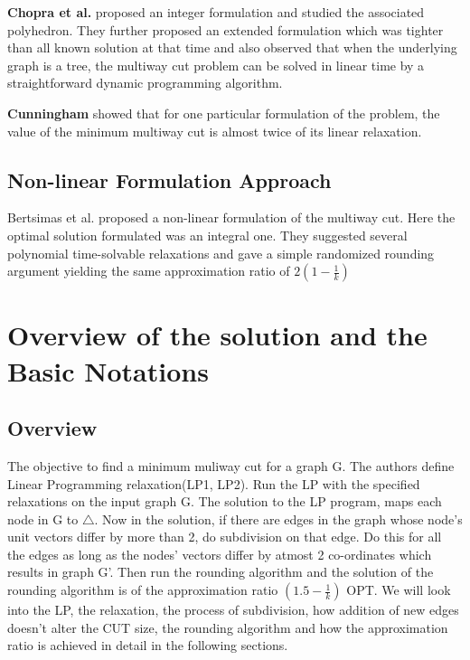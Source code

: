 \documentclass[11pt]{article}
\begin{document}
\textbf{Chopra et al.} proposed an integer formulation and studied the associated polyhedron. They further proposed an extended formulation  which was tighter than all known solution at that time and also observed that when the underlying graph is a tree, the multiway cut problem can be solved in linear time by a straightforward dynamic programming algorithm.

\textbf{Cunningham} showed that for one particular formulation of the problem, the value of the minimum multiway cut is almost twice of its linear relaxation.

\subsection{Non-linear Formulation Approach}
Bertsimas et al.\cite{Bertsimas} proposed a non-linear formulation of the multiway cut. Here the optimal solution formulated was an integral one. They suggested several polynomial time-solvable relaxations and gave a simple randomized rounding argument yielding the same approximation ratio of $2(1 - \frac{1}{k})$

\section{Overview of the solution and the Basic Notations}
\subsection{Overview}
The objective to find a minimum muliway cut for a graph G. The authors define Linear Programming relaxation(LP1, LP2). Run the LP with the specified relaxations on the input graph G. The solution to the LP program, maps each node in G to $\bigtriangleup$. Now in the solution, if there are edges in the graph whose node's unit vectors differ by more than 2, do subdivision on that edge. Do this for all the edges as long as the nodes' vectors differ by atmost 2 co-ordinates which results in graph G'. Then run the rounding algorithm and the solution of the rounding algorithm is of the approximation ratio $(1.5 - \frac{1}{k})$ OPT. We will look into the LP, the relaxation, the process of subdivision, how addition of new edges doesn't alter the CUT size, the rounding algorithm and how the approximation ratio is achieved in detail in the following sections.
\end{document}
